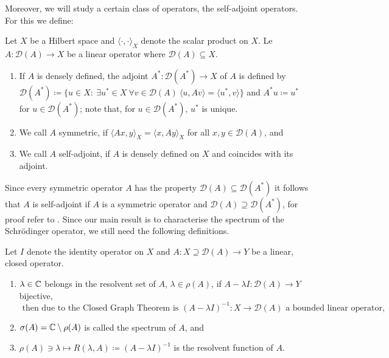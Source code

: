 Moreover, we will study a certain class of operators, the self-adjoint operators. For this we define:

\begin{definition}
Let $X$ be a Hilbert space and $\langle \cdot, \cdot \rangle_{X}$ denote the scalar product on $X$. Le $A \colon \mathcal{D}(A) \rightarrow X$ be a linear operator where $\mathcal{D}(A) \subseteq X$.
	\begin{enumerate}[label=\alph*\upshape)]
		\item If $A$ is densely defined, the adjoint $A^{*} \colon \mathcal{D}(A^{*}) \rightarrow X$ of $A$ is defined by $\mathcal{D}(A^{*}) \coloneqq \{ u \in X \colon ~\exists u^{*} \in X ~\forall v \in \mathcal{D}(A) ~\langle u, Av \rangle = \langle u^{*} , v \rangle \}$ and $A^{*} u \coloneqq u^{*}$ for $u \in \mathcal{D}(A^{*})$; note that, for $u \in \mathcal{D}(A^{*})$, $u^{*}$ is unique.
		\item We call $A$ symmetric, if $\langle Ax,y \rangle_{X} = \langle x , Ay \rangle_{X}$ for all $x,y \in \mathcal{D}(A)$, and
		\item We call $A$ self-adjoint, if $A$ is densely defined on $X$ and coincides with its adjoint.
	\end{enumerate}
\end{definition}

Since every symmetric operator $A$ has the property $\mathcal{D}(A) \subseteq \mathcal{D}(A^{*})$ it follows that $A$ is self-adjoint if $A$ is a symmetric operator and $\mathcal{D}(A) \supseteq \mathcal{D}(A^{*})$, for proof refer to \cite[page 256]{reed1908methods}. Since our main result is to characterise the spectrum of the Schrödinger operator, we still need the following definitions.

\begin{definition}
Let $I$ denote the identity operator on $X$ and $A \colon X \supseteq \mathcal{D}(A) \rightarrow Y$ be a linear, closed operator.
	\begin{enumerate}[label=\alph*\upshape)]
		\item $\lambda \in \mathbb{C}$ belongs in the resolvent set of $A$, $\lambda \in \rho(A)$, if $A  - \lambda I \colon \mathcal{D}(A) \rightarrow Y$ bijective, 
			\[ \text{ then due to the Closed Graph Theorem is } (A - \lambda I)^{-1} \colon X \rightarrow \mathcal{D}(A) \text{ a bounded linear operator,} \]
		\item $\sigma(A) = \mathbb{C} \setminus \rho(A)$ is called the spectrum of $A$, and
		\item $\rho(A) \ni \lambda \mapsto R(\lambda, A) \coloneqq (A - \lambda I)^{-1}$ is the resolvent function of $A$.
	\end{enumerate}		
\end{definition}


